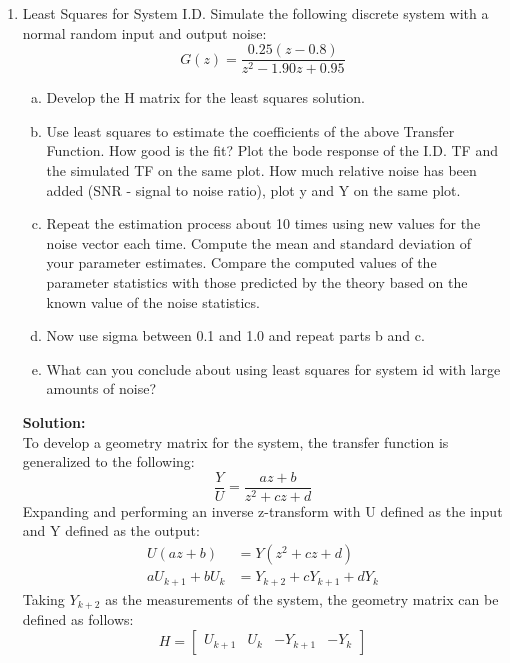 \documentclass[11pt]{article}
\newcommand{\solution}{\textbf{Solution: \\}}
\begin{document}
\begin{enumerate}[label=\textbf{\arabic*.}]
  \newpage
  \item Least Squares for System I.D.  Simulate the following discrete system 
  with a normal random input and output noise:
  \begin{equation*}
    G(z) = \dfrac{0.25(z-0.8)}{z^2-1.90z+0.95}
  \end{equation*}
  \begin{enumerate}[(a)]
    \item Develop the H matrix for the least squares solution.
    \item Use least squares to estimate the coefficients of the above 
    Transfer Function. How good is the fit?  Plot the bode response of the 
    I.D. TF and the simulated TF on the same plot. How much relative noise 
    has been added (SNR - signal to noise ratio), plot y and Y on the same 
    plot.
    \item Repeat the estimation process about 10 times using new values for 
    the noise vector each time. Compute the mean and standard deviation of 
    your parameter estimates. Compare the computed values of the parameter 
    statistics with those predicted by the theory based on the known value of 
    the noise statistics.
    \item Now use sigma between 0.1 and 1.0 and repeat parts b and c.
    \item What can you conclude about using least squares for system id with 
    large amounts of noise?
  \end{enumerate}
  \solution
  To develop a geometry matrix for the system, the transfer function is 
  generalized to the following:
  \begin{equation*}
    \dfrac{Y}{U} = \dfrac{az + b}{z^2 + cz + d}
  \end{equation*}
  Expanding and performing an inverse z-transform with U defined as the input 
  and Y defined as the output:
  \begin{equation*}
    \begin{split}
      U(az+ b) &= Y(z^2 + cz + d) \\
      aU_{k+1} + bU_{k} &= Y_{k+2} + cY_{k+1} + dY_{k}
    \end{split}
  \end{equation*}
  Taking $Y_{k+2}$ as the measurements of the system, the geometry matrix can 
  be defined as follows:
  \begin{equation*}
    H = 
    \begin{bmatrix}
      U_{k+1} & U_{k} & -Y_{k+1} & -Y_{k}
    \end{bmatrix}

\end{equation*}
\end{enumerate}
\end{document}
